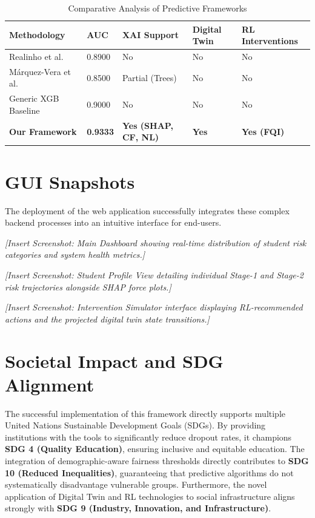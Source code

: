 \documentclass[12pt,a4paper]{report}
\begin{document}
\begin{table}[H]
\centering
\caption{Comparative Analysis of Predictive Frameworks}
\begin{tabular}{|p{3cm}|p{2cm}|p{2cm}|p{2cm}|p{3.5cm}|}
\hline
\textbf{Methodology} & \textbf{AUC} & \textbf{XAI Support} & \textbf{Digital Twin} & \textbf{RL Interventions} \\
\hline
Realinho et al. & 0.8900 & No & No & No \\
\hline
Márquez-Vera et al. & 0.8500 & Partial (Trees) & No & No \\
\hline
Generic XGB Baseline & 0.9000 & No & No & No \\
\hline
\textbf{Our Framework} & \textbf{0.9333} & \textbf{Yes (SHAP, CF, NL)} & \textbf{Yes} & \textbf{Yes (FQI)} \\
\hline
\end{tabular}
\end{table}

\section{GUI Snapshots}
The deployment of the web application successfully integrates these complex backend processes into an intuitive interface for end-users. 
\vspace{0.5cm}

\textit{[Insert Screenshot: Main Dashboard showing real-time distribution of student risk categories and system health metrics.]}
\vspace{0.5cm}

\textit{[Insert Screenshot: Student Profile View detailing individual Stage-1 and Stage-2 risk trajectories alongside SHAP force plots.]}
\vspace{0.5cm}

\textit{[Insert Screenshot: Intervention Simulator interface displaying RL-recommended actions and the projected digital twin state transitions.]}
\vspace{0.5cm}

\section{Societal Impact and SDG Alignment}
The successful implementation of this framework directly supports multiple United Nations Sustainable Development Goals (SDGs). By providing institutions with the tools to significantly reduce dropout rates, it champions \textbf{SDG 4 (Quality Education)}, ensuring inclusive and equitable education. The integration of demographic-aware fairness thresholds directly contributes to \textbf{SDG 10 (Reduced Inequalities)}, guaranteeing that predictive algorithms do not systematically disadvantage vulnerable groups. Furthermore, the novel application of Digital Twin and RL technologies to social infrastructure aligns strongly with \textbf{SDG 9 (Industry, Innovation, and Infrastructure)}.
\end{document}
